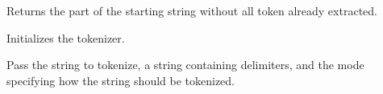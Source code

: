 \label{wxstringtokenizergetstring}


Returns the part of the starting string without all token already extracted.


\label{wxstringtokenizersetstring}


Initializes the tokenizer.

Pass the string to tokenize, a string containing delimiters,
and the mode specifying how the string should be tokenized.


